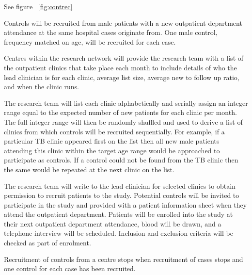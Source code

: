 \documentclass[a4paper,10pt]{article}
\begin{document}
See figure ~\ref{fig:contrec}

Controls will be recruited from male patients with a new outpatient department attendance at the same hospital cases originate from. One male control, frequency matched on age, will be recruited for each case.  

Centres within the research network will provide the research team with a list of the outpatient clinics that take place each month to include details of who the lead clinician is for each clinic, average list size, average new to follow up ratio, and when the clinic runs.

The research team will list each clinic alphabetically and serially assign an integer range equal to the expected number of new patients for each clinic per month. The full integer range will then be randomly shuffled and used to derive a list of clinics from which controls will be recruited sequentially. For example, if a particular TB clinic appeared first on the list then all new male patients attending this clinic within the target age range would be approached to participate as controls. If
 a control could not be found from the TB clinic then the same would be repeated at the next clinic on the list.

The research team will write to the lead clinician for selected clinics to obtain permission to recruit patients to the study. Potential controls will be invited to participate in the study and provided with a patient information sheet when they attend the outpatient department. Patients will be enrolled into the study at their next outpatient department attendance, blood will be drawn, and a telephone interview will be scheduled. Inclusion and exclusion criteria will be checked as
part of enrolment.

Recruitment of controls from a centre stops when recruitment of cases stops and one control for each case has been recruited.
\end{document}
